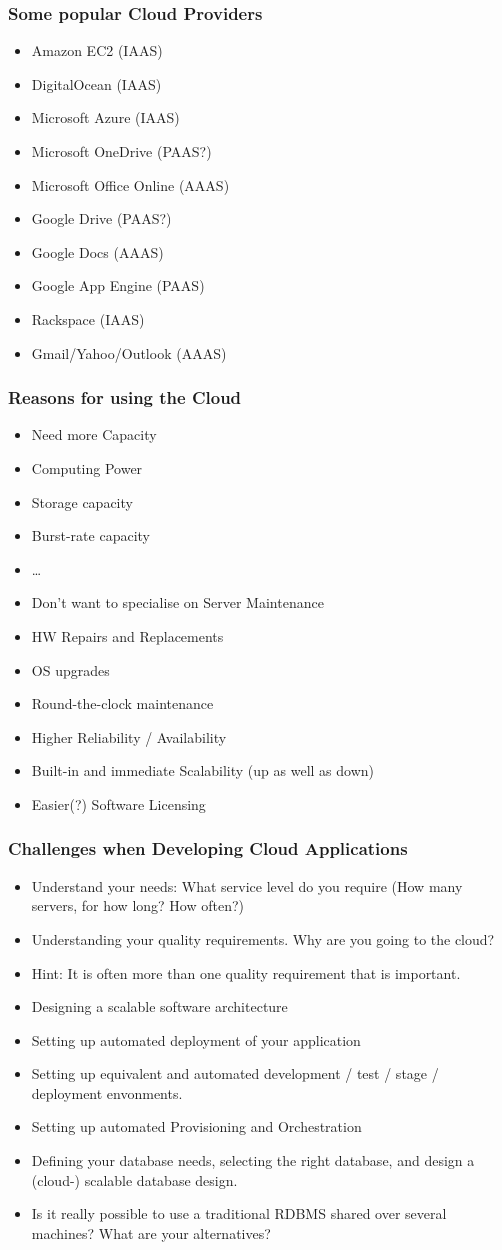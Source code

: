 \documentclass[10pt]{beamer}
\def\subitem{\item[\hspace{1.5cm} -]}
\begin{document}
\begin{frame}[t]
\frametitle{Some popular Cloud Providers}
\begin{itemize}
\item Amazon EC2 (IAAS)
\item DigitalOcean (IAAS)
\item Microsoft Azure (IAAS)
\item Microsoft OneDrive (PAAS?)
\item Microsoft Office Online (AAAS)
\item Google Drive (PAAS?)
\item Google Docs (AAAS)
\item Google App Engine (PAAS)
\item Rackspace (IAAS)
\item Gmail/Yahoo/Outlook (AAAS)
\end{itemize}
\end{frame}


\begin{frame}[t]
\frametitle{Reasons for using the Cloud}
\begin{itemize}
\item Need more Capacity
\subitem Computing Power
\subitem Storage capacity
\subitem Burst-rate capacity
\subitem \ldots
\item Don't want to specialise on Server Maintenance
\subitem HW Repairs and Replacements
\subitem OS upgrades
\subitem Round-the-clock maintenance
\item Higher Reliability / Availability
\item Built-in and immediate Scalability (up as well as down)
\item Easier(?) Software Licensing
\end{itemize}
\end{frame}



\begin{frame}[t]
\frametitle{Challenges when Developing Cloud Applications}
\begin{itemize}[<+->]
\item Understand your needs: What service level do you require (How many servers, for how long? How often?)
\item Understanding your quality requirements. Why are you going to the cloud?
\subitem Hint: It is often more than one quality requirement that is important.
\item Designing a scalable software architecture
\item Setting up automated deployment of your application
\item Setting up equivalent and automated development / test / stage / deployment envonments.
\item Setting up automated Provisioning and Orchestration
\item Defining your database needs, selecting the right database, and design a (cloud-) scalable database design.
\subitem Is it really possible to use a traditional RDBMS shared over several machines? What are your alternatives?
\end{itemize}
\end{frame}
\end{document}

